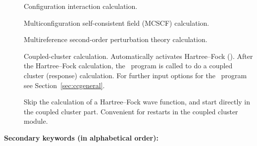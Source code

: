 \begin{description}
\item[]
  Configuration interaction calculation.

\item[]
  Multiconfiguration self-consistent field (MCSCF) calculation.

\item[]
  Multireference second-order perturbation theory calculation.

\item[]
  Coupled-cluster calculation. Automatically activates Hartree--Fock ().
  After the Hartree--Fock calculation,
  the \cc\ program is called to do a coupled cluster (response) calculation.
  For further input options for the \cc\ program see Section~\ref{sec:ccgeneral}. 

\item[] Skip the calculation of a Hartree--Fock wave
  function, and start directly in the coupled cluster part. Convenient
  for restarts in the coupled cluster module.

\end{description}

{\bf Secondary keywords (in alphabetical order): }

